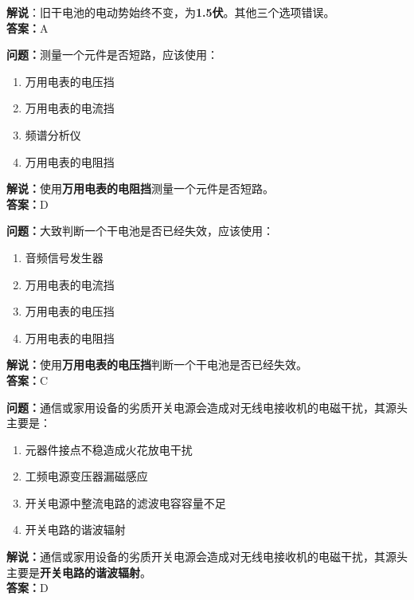 \documentclass{ctexbook}
\begin{document}
\noindent\textbf{解说}：旧干电池的电动势始终不变，为\textbf{1.5伏}。其他三个选项错误。\\\noindent\textbf{答案：}A

\bigskip


\noindent\textbf{问题：}测量一个元件是否短路，应该使用：

\begin{enumerate}[label=\Alph*), leftmargin=3em]
	\item 万用电表的电压挡
	\item 万用电表的电流挡
	\item 频谱分析仪
	\item 万用电表的电阻挡
\end{enumerate}

\noindent\textbf{解说：}使用\textbf{万用电表的电阻挡}测量一个元件是否短路。\\\noindent\textbf{答案：}D

\bigskip


\noindent\textbf{问题：}大致判断一个干电池是否已经失效，应该使用：

\begin{enumerate}[label=\Alph*), leftmargin=3em]
	\item 音频信号发生器
	\item 万用电表的电流挡
	\item 万用电表的电压挡
	\item 万用电表的电阻挡
\end{enumerate}

\noindent\textbf{解说：}使用\textbf{万用电表的电压挡}判断一个干电池是否已经失效。\\\noindent\textbf{答案：}C

\bigskip


\noindent\textbf{问题：}通信或家用设备的劣质开关电源会造成对无线电接收机的电磁干扰，其源头主要是：

\begin{enumerate}[label=\Alph*), leftmargin=3em]
	\item 元器件接点不稳造成火花放电干扰
	\item 工频电源变压器漏磁感应
	\item 开关电源中整流电路的滤波电容容量不足
	\item 开关电路的谐波辐射
\end{enumerate}

\noindent\textbf{解说：}通信或家用设备的劣质开关电源会造成对无线电接收机的电磁干扰，其源头主要是\textbf{开关电路的谐波辐射}。\\\noindent\textbf{答案：}D
\end{document}
